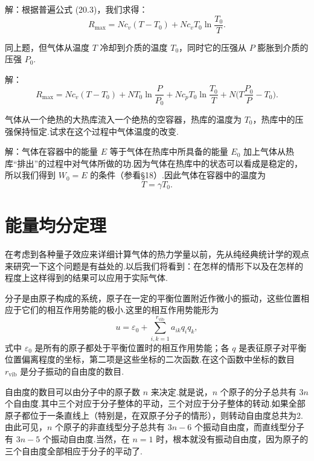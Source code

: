 \begin{xiti}
解：根据普遍公式 (20.3)，我们求得：
\begin{equation*}
  R_{\mathrm{max}}=Nc_v(T-T_0)+Nc_vT_0\ln\frac{T_0}{T}.
\end{equation*}

\quad 同上题，但气体从温度 $T$ 冷却到介质的温度 $T_0$，同时它的压强从 $P$ 膨胀到介质的压强 $P_0$.

解：
\begin{equation*}
  R_{\mathrm{max}}=Nc_v(T-T_0)+NT_0\ln\frac{P}{P_0}
  +Nc_pT_0\ln\frac{T_0}{T}+N\Big(T\frac{P_0}{P}-T_0\Big).
\end{equation*}

\quad 气体从一个绝热的大热库流入一个绝热的空容器，热库的温度为 $T_0$，热库中的压强保持恒定.试求在这个过程中气体温度的改变.

解：气体在容器中的能量 $E$ 等于气体在热库中所具备的能量 $E_0$ 加上气体从热库“排出”的过程中对气体所做的功.因为气体在热库中的状态可以看成是稳定的，所以我们得到 $W_0=E$ 的条件（参看§18）.因此气体在容器中的温度为
\begin{equation*}
  T=\gamma T_0.
\end{equation*}

\end{xiti}

\section{能量均分定理}

在考虑到各种量子效应来详细计算气体的热力学量以前，先从纯经典统计学的观点来研究一下这个问题是有益处的.以后我们将看到：在怎样的情形下以及在怎样的程度上这样得到的结果可以应用于实际气体.

分子是由原子构成的系统，原子在一定的平衡位置附近作微小的振动，这些位置相应于它们的相互作用势能的极小.这里的相互作用势能形为
\begin{equation*}
  u=\varepsilon_0+\sum_{i,k=1}^{r_{\mathrm{vib}}}a_{ik}q_iq_k,
\end{equation*}
式中 $\varepsilon_0$ 是所有的原子都处于平衡位置时的相互作用势能；各 $q$ 是表征原子对平衡位置偏离程度的坐标，第二项是这些坐标的二次函数.在这个函数中坐标的数目 $r_{\mathrm{vib}}$ 是分子振动的自由度的数目.

自由度的数目可以由分子中的原子数 $n$ 来决定.就是说，$n$ 个原子的分子总共有 $3n$ 个自由度.其中三个对应于分子整体的平动，三个对应于分子整体的转动.如果全部原子都位于一条直线上（特别是，在双原子分子的情形），则转动自由度总共为2.由此可见，$n$ 个原子的非直线型分子总共有 $3n-6$ 个振动自由度，而直线型分子有 $3n-5$ 个振动自由度.当然，在 $n=1$ 时，根本就没有振动自由度，因为原子的三个自由度全部相应于分子的平动了.

